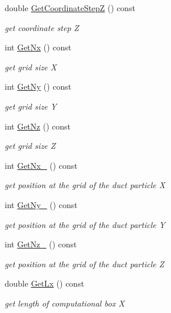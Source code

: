 \begin{DoxyCompactItemize}
double \mbox{\hyperlink{classconverter_af2f9301cdbcd2a6686d57f70eaebde67}{Get\+Coordinate\+StepZ}} () const
\begin{DoxyCompactList}\small\item\em get coordinate step Z \end{DoxyCompactList}\item 
int \mbox{\hyperlink{classconverter_a75d08969a972c30b96b5bfeb9fb39d03}{Get\+Nx}} () const
\begin{DoxyCompactList}\small\item\em get grid size X \end{DoxyCompactList}\item 
int \mbox{\hyperlink{classconverter_a01bbb22fc729f7ec1c48ffada82922aa}{Get\+Ny}} () const
\begin{DoxyCompactList}\small\item\em get grid size Y \end{DoxyCompactList}\item 
int \mbox{\hyperlink{classconverter_ac9b3c0f9d011f2979fcc8eb886043f55}{Get\+Nz}} () const
\begin{DoxyCompactList}\small\item\em get grid size Z \end{DoxyCompactList}\item 
int \mbox{\hyperlink{classconverter_a28a15a04873f427990d76c49b595f468}{Get\+Nx\+\_}} () const
\begin{DoxyCompactList}\small\item\em get position at the grid of the duct particle X \end{DoxyCompactList}\item 
int \mbox{\hyperlink{classconverter_a43a45f0717ab21a88349d6ea66be55f2}{Get\+Ny\+\_}} () const
\begin{DoxyCompactList}\small\item\em get position at the grid of the duct particle Y \end{DoxyCompactList}\item 
int \mbox{\hyperlink{classconverter_afb26f3a944dc5bf3d0ec0bf1ab5e278d}{Get\+Nz\+\_}} () const
\begin{DoxyCompactList}\small\item\em get position at the grid of the duct particle Z \end{DoxyCompactList}\item 
double \mbox{\hyperlink{classconverter_ae315d5d2305093804dc82ae96fed56e4}{Get\+Lx}} () const
\begin{DoxyCompactList}\small\item\em get length of computational box X \end{DoxyCompactList}\item 

\end{DoxyCompactItemize}
